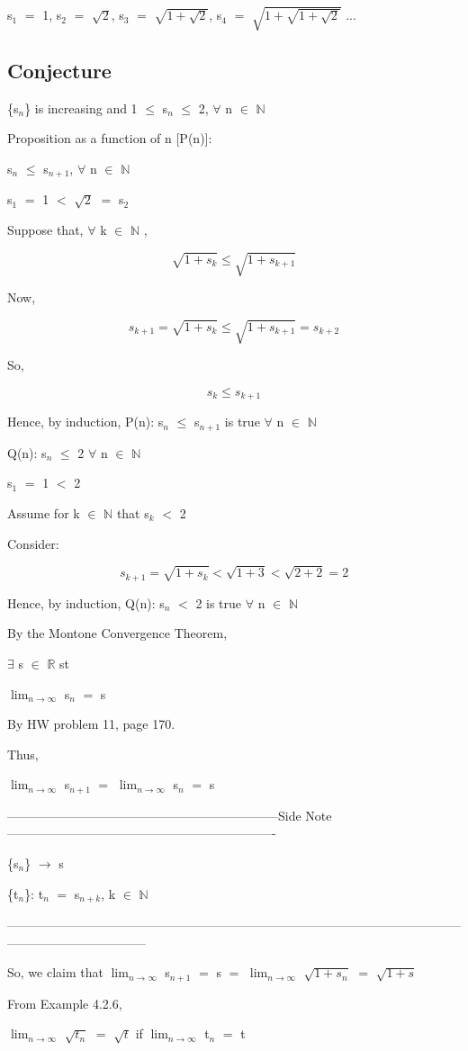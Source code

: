 \documentclass{article}
\newcommand{\mt}[1]{\ensuremath{#1}}
\newcommand\ssc[2][\DefaultOpt]{%
  \def\DefaultOpt{#2}%
  \subsection[#1]{#2}%
}
\newcommand{\sidenote}[1]{-----------------------------------------------------------------Side Note----------------------------------------------------------------
#1 \

---------------------------------------------------------------------------------------------------------------------------------------------}
\newcommand{\br}{\mt{\mathbb{R}} }       %
\newcommand{\bn}{\mt{\mathbb{N}} }       %
\newcommand{\fa}{\mt{\forall} }          %
\newcommand{\mem}{\mt{\in} }
\newcommand{\exs}{\mt{\exists} }
\newcommand{\lra}{ \mt{\longrightarrow} } %
\newcommand{\bk}[1]{\{#1\}}
\newcommand{\ps}{\mt{+} }
\newcommand{\ls}{\mt{<} }
\newcommand{\lse}{\mt{\leq} }
\newcommand{\eql}{\mt{=} }
\newcommand{\uw}[2]{#1\mt{_{#2}}}
\newcommand{\lmti}[1]{\mt{\displaystyle{\lim_{#1 \to \infty}}}}
\newcommand{\eqn}[1]{\[#1\]}
\begin{document}
{{\uw{s}{1} \eql 1, \uw{s}{2} \eql $\sqrt{2}$, \uw{s}{3} \eql $\sqrt{1 \ps \sqrt{2}}$, \uw{s}{4} \eql $\sqrt{1 + \sqrt{1 \ps \sqrt{2}}}$ ...

}

\ssc{Conjecture}{

\bk{\uw{s}{n}} is increasing and 1 \lse \uw{s}{n} \lse 2, \fa n \mem \bn

Proposition as a function of n [P(n)]:

\uw{s}{n} \lse \uw{s}{n + 1}, \fa n \mem \bn 

\uw{s}{1} \eql 1 \ls $\sqrt{2}$ \eql \uw{s}{2}

Suppose that, \fa k \mem \bn,

\eqn{\sqrt{1 + s_k} \lse \sqrt{1 + s_{k + 1}}}

Now,

\eqn{s_{k + 1} = \sqrt{1	 + s_k} \lse \sqrt{1 + s_{k + 1}} = s_{k + 2}}

So,

\eqn{s_k \lse s_{k + 1}}

Hence, by induction, P(n): \uw{s}{n} \lse \uw{s}{n + 1} is true \fa n \mem \bn 

Q(n): \uw{s}{n} \lse 2 \fa n \mem \bn 

\uw{s}{1} \eql 1 \ls 2

Assume for k \mem \bn that \uw{s}{k} \ls 2

Consider:

\eqn{s_{k + 1} = \sqrt{1 + s_k} < \sqrt{1 + 3} < \sqrt{2 + 2} = 2}

Hence, by induction, Q(n): \uw{s}{n} \ls 2 is true \fa n \mem \bn 

}

By the Montone Convergence Theorem,

\exs s \mem \br st

\lmti{n} \uw{s}{n} \eql s

By HW problem 11, page 170.

Thus,

\lmti{n} \uw{s}{n + 1} \eql \lmti{n} \uw{s}{n} \eql s

\sidenote{
\bk{\uw{s}{n}} \lra s

\bk{\uw{t}{n}}: \uw{t}{n} \eql \uw{s}{n + k}, k \mem \bn 
}

So, we claim that \lmti{n} \uw{s}{n + 1} \eql s \eql \lmti{n} $\sqrt{1 + s_n}$ \eql $\sqrt{1 + s}$

From Example 4.2.6,

\lmti{n} $\sqrt{\uw{t}{n}}$ \eql $\sqrt{t}$ if \lmti{n} \uw{t}{n} \eql t

}
\end{document}
